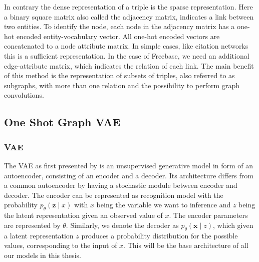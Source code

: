 In contrary the dense representation of a triple is the sparse representation. Here a binary square matrix also called the adjacency matrix, indicates a link between two entities. To identify the node, each node in the adjacency matrix has a one-hot encoded entity-vocabulary vector. All one-hot encoded vectors are concatenated to a node attribute matrix.
In simple cases, like citation networks this is a sufficient representation. In the case of Freebase, we need an additional edge-attribute matrix, which indicates the relation  of each link. The main benefit of this method is the representation of subsets of triples, also referred to as subgraphs, with more than one relation and the possibility to perform graph convolutions. 



\subsection{One Shot Graph VAE}

\subsubsection{VAE}
\label{ssection:VAE}



The VAE as first presented by \cite{kingma_auto-encoding_2014} is an unsupervised generative model in form of an autoencoder, consisting of an encoder and a decoder. Its architecture differs from a common autoencoder by having a stochastic module between encoder and decoder. The encoder can be represented as recognition model with the probability $p_{{\theta}}(\mathbf{z} \mid x)$ with $x$ being the variable we want to inference and $z$ being the latent representation given an observed value of $x$. The encoder parameters are represented by $\theta$. Similarly, we denote the decoder as $p_{{\theta}}(\mathbf{x} \mid z)$, which given a latent representation $z$ produces a probability distribution for the possible values, corresponding to the input of $x$. This will be the base architecture of all our models in this thesis.

